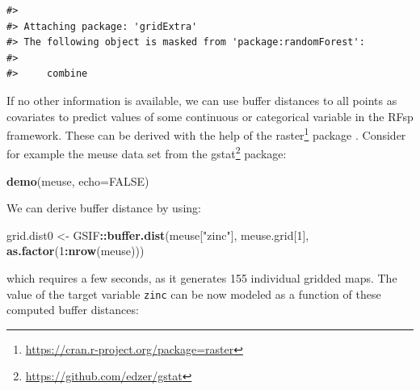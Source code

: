 \documentclass[graybox,natbib,nospthms,UStrade]{svmono}
\newenvironment{Shaded}{\begin{snugshade}}{\end{snugshade}}
\newcommand{\DataTypeTok}[1]{\textcolor[rgb]{0.27,0.27,0.27}{#1}}
\newcommand{\DecValTok}[1]{\textcolor[rgb]{0.06,0.06,0.06}{#1}}
\newcommand{\KeywordTok}[1]{\textcolor[rgb]{0.27,0.27,0.27}{\textbf{#1}}}
\newcommand{\NormalTok}[1]{#1}
\newcommand{\OperatorTok}[1]{\textcolor[rgb]{0.43,0.43,0.43}{\textbf{#1}}}
\newcommand{\OtherTok}[1]{\textcolor[rgb]{0.37,0.37,0.37}{#1}}
\newcommand{\StringTok}[1]{\textcolor[rgb]{0.5,0.5,0.5}{#1}}
\renewcommand{\href}[2]{#2 (\url{#1})}
\renewcommand{\href}[2]{#2\footnote{\url{#1}}}
\begin{document}
\begin{verbatim}
#> 
#> Attaching package: 'gridExtra'
#> The following object is masked from 'package:randomForest':
#> 
#>     combine
\end{verbatim}

If no other information is available, we can use buffer distances to all points as covariates to predict values of some continuous or categorical variable in the RFsp framework. These can be derived with the help of the \href{https://cran.r-project.org/package=raster}{raster} package \citep{raster}. Consider for example the meuse data set from the \href{https://github.com/edzer/gstat}{gstat} package:

\begin{Shaded}
\begin{Highlighting}[]
\KeywordTok{demo}\NormalTok{(meuse, }\DataTypeTok{echo=}\OtherTok{FALSE}\NormalTok{)}
\end{Highlighting}
\end{Shaded}

We can derive buffer distance by using:

\begin{Shaded}
\begin{Highlighting}[]
\NormalTok{grid.dist0 <-}\StringTok{ }\NormalTok{GSIF}\OperatorTok{::}\KeywordTok{buffer.dist}\NormalTok{(meuse[}\StringTok{"zinc"}\NormalTok{], meuse.grid[}\DecValTok{1}\NormalTok{], }\KeywordTok{as.factor}\NormalTok{(}\DecValTok{1}\OperatorTok{:}\KeywordTok{nrow}\NormalTok{(meuse)))}
\end{Highlighting}
\end{Shaded}

which requires a few seconds, as it generates 155 individual gridded maps. The value of the target variable \texttt{zinc} can be now modeled as a function of these computed buffer distances:
\end{document}
